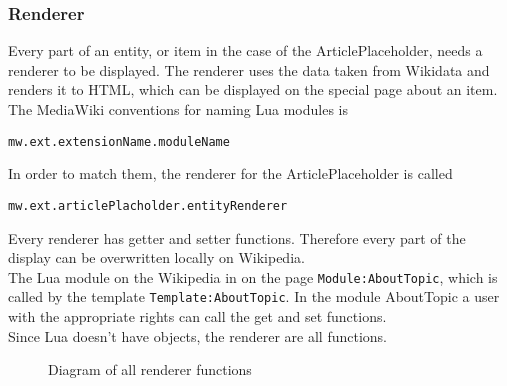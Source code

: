 \subsubsection{Renderer}

Every part of an entity, or item in the case of the ArticlePlaceholder, needs a renderer to be displayed. The renderer uses the data taken from Wikidata and renders it to HTML, which can be displayed on the special page about an item. \\
The MediaWiki conventions for naming Lua modules is 
\begin{center}
\texttt{mw.ext.extensionName.moduleName} 
\end{center}
In order to match them, the renderer for the ArticlePlaceholder is called 
\begin{center}
\texttt{mw.ext.articlePlacholder.entityRenderer}
\end{center}
Every renderer has getter and setter functions. Therefore every part of the display can be overwritten locally on Wikipedia. \\
The Lua module on the Wikipedia in on the page \texttt{Module:AboutTopic}, which is called by the template \texttt{Template:AboutTopic}. In the module AboutTopic a user with the appropriate rights can call the get and set functions. \\
Since Lua doesn't have objects, the renderer are all functions. 

\begin{figure}[ht]
	\centering
	
	\caption{Diagram of all renderer functions}
	\label{fig:renderer}
\end{figure}

